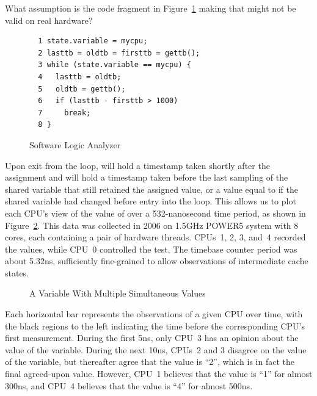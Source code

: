 \QuickQuiz{}
	What assumption is the code fragment
	in Figure~\ref{fig:advsync:Software Logic Analyzer}
	making that might not be valid on real hardware?
 \QuickQuizEnd

\begin{figure}[htbp]
{ \centering
\scriptsize
\begin{verbatim}
  1 state.variable = mycpu;
  2 lasttb = oldtb = firsttb = gettb();
  3 while (state.variable == mycpu) {
  4   lasttb = oldtb;
  5   oldtb = gettb();
  6   if (lasttb - firsttb > 1000)
  7     break;
  8 }
\end{verbatim}
}
\caption{Software Logic Analyzer}
\label{fig:advsync:Software Logic Analyzer}
\end{figure}

Upon exit from the loop,  will hold a timestamp
taken shortly after the assignment and  will hold
a timestamp taken before the last sampling of the shared variable
that still retained the assigned value, or a value equal to 
if the shared variable had changed before entry into the loop.
This allows us to plot each CPU's view of the value of 
over a 532-nanosecond time period, as shown in
Figure~\ref{fig:advsync:A Variable With Multiple Simultaneous Values}.
This data was collected in 2006 on 1.5GHz POWER5 system with 8 cores,
each containing a pair of hardware threads.
CPUs~1, 2, 3, and~4 recorded the values, while CPU~0 controlled the test.
The timebase counter period was about 5.32ns, sufficiently fine-grained
to allow observations of intermediate cache states.

\begin{figure}[htb]
\begin{center}
\end{center}
\caption{A Variable With Multiple Simultaneous Values}
\label{fig:advsync:A Variable With Multiple Simultaneous Values}
\end{figure}

Each horizontal bar represents the observations of a given CPU over time,
with the black regions to the left indicating the time before the
corresponding CPU's first measurement.
During the first 5ns, only CPU~3 has an opinion about the value of the
variable.
During the next 10ns, CPUs~2 and 3 disagree on the value of the variable,
but thereafter agree that the value is ``2'', which is in fact
the final agreed-upon value.
However, CPU~1 believes that the value is ``1'' for almost 300ns, and
CPU~4 believes that the value is ``4'' for almost 500ns.

